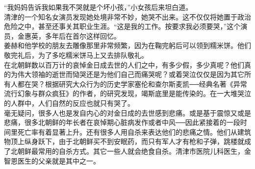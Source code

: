 “我妈妈告诉我如果我不哭就是个坏小孩，”小女孩后来坦白道。\\

清津的一个知名女演员发现她处境非常不妙，她哭不出来。这不仅仅将她置于政治危险之中，甚至还事关其职业生涯。“这是我的工作。按要求我必须要哭，”这个演员，金惠英，多年后在首尔这样回忆。\\

姜赫和他学校的朋友去雕像那里非常频繁，因为在鞠完躬后可以领到糯米饼。他们敬完礼后，为了多吃糯米饼马上又去排队敬礼。\\

在北朝鲜数以百万计的哀悼金日成去世的人们之中，有多少假，多少真呢？他们真的为伟大领袖的逝世而恸哭还是为他们自己而痛哭呢？或着哭泣仅仅是因为其它所有人都在哭？根据研究大众行为的历史学家塞伦和查尔斯麦凯──经典名著《异常流行幻象与群众疯狂》的作者，的研究发现，竭斯底里是能传染的。在一大堆哭泣的人群中，人们自然的反应也就只有哭了。\\

毫无疑问，很多人也是发自内心的对金日成的去世感到悲痛。或是基于震惊又或是悲痛，很多北朝鲜的年长者在哀悼期心脏病发作或者中风──因此紧接着的一段时间里死亡率有着显著上升。还有很多人用自杀来表达他们的悲痛之情。他们从建筑物顶上纵身跃下，由于北朝鲜买不到安眠药，而只有军人才有枪和子弹，跳楼就成了北朝鲜最常用的自杀方式。其它一些人就会绝食自杀。清津市医院儿科医生，金智恩医生的父亲就是其中之一。\\
